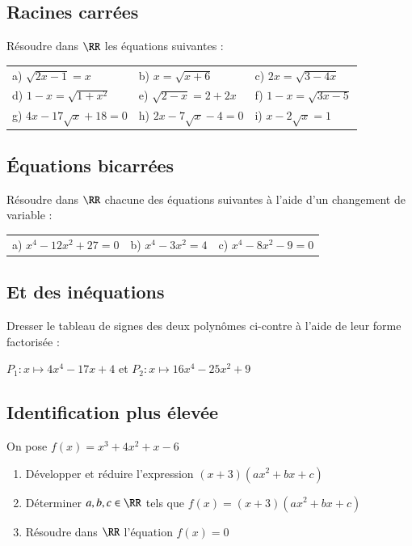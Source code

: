\documentclass[oneside,12pt]{article}          %
\begin{document}
\subsection{Racines carrées}
Résoudre dans $\RR$ les équations suivantes :

\renewcommand{\arraystretch}{1.4}
\begin{tabular}{p{} p{} p{} }
    a) $\sqrt{2x-1}=x$ &  b) $x=\sqrt{x+6} $ & c) $2x=\sqrt{3-4x}$ \\
    d) $1-x=\sqrt{1+x^{2}}$ & e) $\sqrt{2-x}=2+2x$ & f) $1-x=\sqrt{3x-5}$\\
    g) $4x-17\sqrt{x}+18=0$ & h) $2x-7\sqrt{x}-4=0$ & i) $x-2\sqrt{x}=1$
\end{tabular}



\subsection{Équations bicarrées}
Résoudre dans $\RR$ chacune des équations suivantes à l'aide d'un changement de variable :

\begin{tabular}{p{} p{} p{} }
    a) $x^{4}-12x^{2}+27=0$ & b) $x^{4}-3x^{2} = 4 $ & c) $x^{4}-8x^{2}-9=0$
\end{tabular}



\subsection{Et des inéquations}
Dresser le tableau de signes des deux polynômes ci-contre à l'aide de leur forme factorisée :

$P_1:x\mapsto 4x^4-17x+4$ \qquad et \qquad $P_2:x\mapsto 16x^4-25x^2+9$



\subsection{Identification plus élevée}
On pose $f(x) = x^3+4x^2+x-6 $
\begin{enumerate}
    \item Développer et réduire l'expression $(x+3)(ax^{2}+bx+c) $ 
    \item Déterminer $a,b,c\in\RR$ tels que $f(x) = (x+3)(ax^{2}+bx+c) $ 
    \item Résoudre dans $\RR$ l'équation $f(x)=0$ 
\end{enumerate} 
\end{document}
